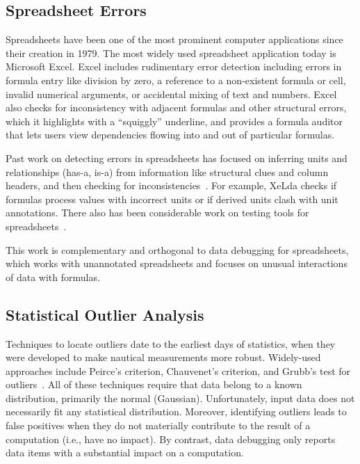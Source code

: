 \subsection*{Spreadsheet Errors}

Spreadsheets have been one of the most prominent computer applications
since their creation in 1979.
 The most widely used spreadsheet application today is Microsoft
Excel. Excel includes rudimentary error detection including errors in
formula entry like division by zero, a reference to a non-existent
formula or cell, invalid numerical arguments, or accidental mixing of
text and numbers.
Excel also checks for inconsistency with adjacent formulas and other
structural errors, which it highlights with a ``squiggly'' underline, and provides a formula auditor that lets users view dependencies flowing into and out of particular formulas.

Past work on detecting errors in spreadsheets has focused on inferring
units and relationships (has-a, is-a) from information like structural
clues and column
headers, and then checking for inconsistencies~\cite{Antoniu:2004:VUC:998675.999448,DBLP:conf/kbse/AhmadAGK03,Chambers:2010:RSL:1860134.1860346,Erwig:2009:SES:1608570.1608694,Erwig:2005:AGM:1062455.1062494}. For
example, XeLda checks if formulas process values with incorrect units
or if derived units clash with unit annotations. There also has been
considerable work on testing tools for
spreadsheets~\cite{fisher2006scaling,rothermel1998you,rothermel2001methodology,Carver:2006:EET:1159733.1159775}.

This work is complementary and orthogonal to data debugging for spreadsheets, which
works with unannotated spreadsheets and focuses on unusual
interactions of data with formulas.



\subsection*{Statistical Outlier Analysis}

Techniques to locate outliers date to the earliest days of statistics,
when they were developed to make nautical measurements more
robust. Widely-used approaches include Peirce's criterion, Chauvenet's
criterion, and Grubb's test for
outliers~\cite{barnett1994outliers}. All of these techniques require
that data belong to a known distribution, primarily the normal
(Gaussian). Unfortunately, input data does not necessarily fit any
statistical distribution. Moreover, identifying outliers leads to
false positives when they do not materially contribute to the result
of a computation (i.e., have no impact). By contrast, data debugging only reports
data items with a substantial impact on a computation.


